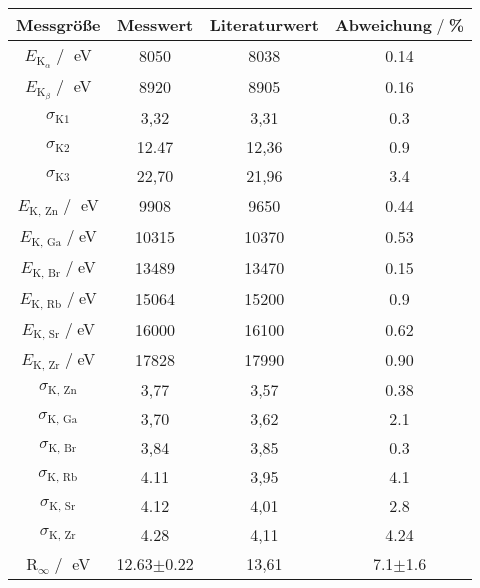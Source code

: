\begin{table}[H]
    \centering
    \begin{tabular}{c | c c c}
        \toprule
        {Messgröße} & {Messwert} & {Literaturwert}& Abweichung$\;/\;$\% \\
        \midrule
        $E_{\text{K}_{\alpha}}\;/\;$ eV & 8050 & 8038& 0.14  \\
        $E_{\text{K}_{\beta}}\;/\;$ eV  & 8920 & 8905& 0.16 \\
        $\sigma_{\text{K1}}$         & 3,32 & 3,31 &0.3   \\
        $\sigma_{\text{K2}}$         & 12.47& 12,36 & 0.9 \\
        $\sigma_{\text{K3}}$         & 22,70 & 21,96 & 3.4 \\
        \midrule
        $E_{\text{K, Zn}}\;/\;$ eV      & 9908  & 9650 & 0.44\\
        $E_{\text{K, Ga}}\;/\;$eV      & 10315  & 10370 & 0.53 \\
        $E_{\text{K, Br}}\;/\;$eV      & 13489 & 13470 & 0.15\\
        $E_{\text{K, Rb}}\;/\;$eV      & 15064 & 15200 & 0.9\\
        $E_{\text{K, Sr}}\;/\;$eV      & 16000 & 16100 & 0.62\\
        $E_{\text{K, Zr}}\;/\;$eV      & 17828 & 17990 & 0.90\\
        $\sigma_{\text{K, Zn}}$  & 3,77  & 3,57  & 0.38\\
        $\sigma_{\text{K, Ga}}$  & 3,70 & 3,62 & 2.1 \\
        $\sigma_{\text{K, Br}}$  & 3,84 & 3,85 & 0.3 \\
        $\sigma_{\text{K, Rb}}$  & 4.11  & 3,95 & 4.1  \\
        $\sigma_{\text{K, Sr}}$  & 4.12  & 4,01 & 2.8 \\
        $\sigma_{\text{K, Zr}}$  & 4.28  & 4,11 & 4.24 \\
        \midrule
        $\text{R}_{\infty}\;/\;$ eV & 12.63$\pm$0.22 & 13,61& 7.1$\pm$1.6 \\
        \bottomrule
    \end{tabular}
    \caption{}
\end{table}